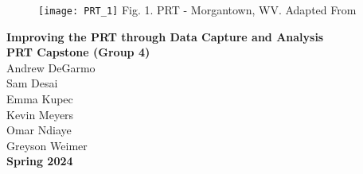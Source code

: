 \begin{titlepage}
    \begin{center}
        \begin{figure}[t]
            \texttt{[image: PRT\_1]}
            Fig. 1. PRT - Morgantown, WV. Adapted From \cite{M_2018}
        \end{figure}
        \fontsize{24}{28}\selectfont
        \textbf{Improving the PRT through Data Capture and Analysis}\\
        \vspace{0.25cm}
        \vspace*{\fill}
        \fontsize{10}{11}\selectfont
        \textbf{PRT Capstone (Group 4)}\\
        Andrew DeGarmo\\
        Sam Desai\\
        Emma Kupec\\
        Kevin Meyers\\
        Omar Ndiaye\\
        Greyson Weimer\\
        \vspace*{\fill}
        \textbf{Spring 2024}\\
    \end{center}
\end{titlepage}